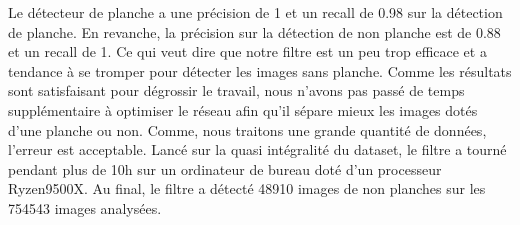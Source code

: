 Le détecteur de planche a une précision de 1 et un recall de 0.98 sur la détection de planche. En revanche, la précision sur la détection de non planche est de 0.88 et un recall de 1. Ce qui veut dire que notre filtre est un peu trop efficace et a tendance à se tromper pour détecter les images sans planche. Comme les résultats sont satisfaisant pour dégrossir le travail, nous n'avons pas passé de temps supplémentaire à optimiser le réseau afin qu'il sépare mieux les images dotés d'une planche ou non. Comme, nous traitons une grande quantité de données, l'erreur est acceptable. Lancé sur la quasi intégralité du dataset, le filtre a tourné pendant plus de 10h sur un ordinateur de bureau doté d'un processeur Ryzen9500X. Au final, le filtre a détecté 48910 images de non planches sur les 754543 images analysées.
